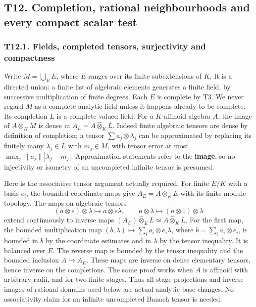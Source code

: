 \documentclass[
  10pt,
]{article}
\begin{document}
\subsection{T12. Completion, rational neighbourhoods and every compact
scalar
test}\label{t12.-completion-rational-neighbourhoods-and-every-compact-scalar-test}

\subsubsection{T12.1. Fields, completed tensors, surjectivity and
compactness}\label{t12.1.-fields-completed-tensors-surjectivity-and-compactness}

Write \(M=\bigcup_E E\), where \(E\) ranges over its finite
subextensions of \(K\). It is a directed union: a finite list of
algebraic elements generates a finite field, by successive
multiplication of finite degrees. Each \(E\) is complete by T3. We never
regard \(M\) as a complete analytic field unless it happens already to
be complete. Its completion \(L\) is a complete valued field. For a
\(K\)-affinoid algebra \(A\), the image of \(A\otimes_K M\) is dense in
\(A_L=A\widehat\otimes_K L\). Indeed finite algebraic tensors are dense
by definition of completion; a tensor \(\sum a_j\otimes\lambda_j\) can
be approximated by replacing its finitely many \(\lambda_j\in L\) with
\(m_j\in M\), with tensor error at most
\(\max_j\|a_j\||\lambda_j-m_j|\). Approximation statements refer to the
\textbf{image}, so no injectivity or isometry of an uncompleted infinite
tensor is presumed.

Here is the associative tensor argument actually required. For finite
\(E/K\) with a basis \(e_i\), the bounded coordinate maps give
\(A_E=A\otimes_K E\) with its finite-module topology. The maps on
algebraic tensors \[
 (a\otimes e)\otimes\lambda\mapsto a\otimes e\lambda,
 \qquad a\otimes\lambda\mapsto(a\otimes1)\otimes\lambda
                                                               \tag{30}
\] extend continuously to inverse maps
\((A_E)\widehat\otimes_E L\simeq A\widehat\otimes_K L\). For the first
map, the bounded multiplication map
\((b,\lambda)\mapsto\sum_i a_i\otimes e_i\lambda\), where
\(b=\sum_i a_i\otimes e_i\), is bounded in \(b\) by the coordinate
estimates and in \(\lambda\) by the tensor inequality. It is balanced
over \(E\). The reverse map is bounded by the tensor inequality and the
bounded inclusion \(A\to A_E\). These maps are inverse on dense
elementary tensors, hence inverse on the completions. The same proof
works when \(A\) is affinoid with arbitrary radii, and for two finite
stages. Thus all stage projections and inverse images of rational
domains used below are actual analytic base changes. No associativity
claim for an infinite uncompleted Banach tensor is needed.
\end{document}
